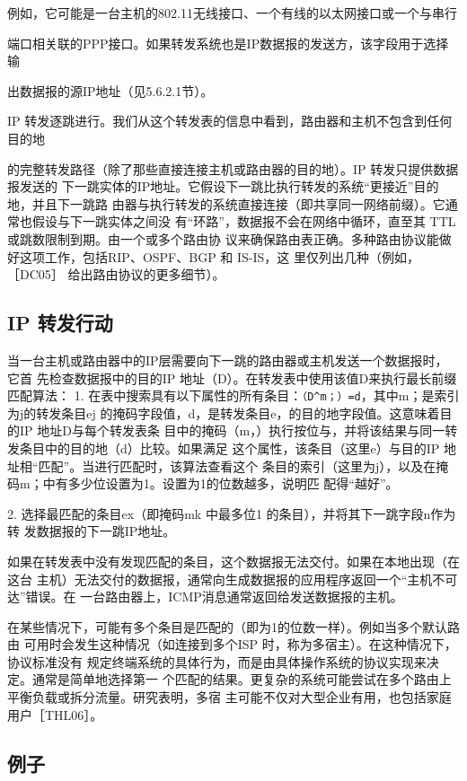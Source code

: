 例如，它可能是一台主机的802.11无线接口、一个有线的以太网接口或一个与串行

端口相关联的PPP接口。如果转发系统也是IP数据报的发送方，该字段用于选择输

出数据报的源IP地址（见5.6.2.1节）。

IP 转发逐跳进行。我们从这个转发表的信息中看到，路由器和主机不包含到任何目的地

的完整转发路径（除了那些直接连接主机或路由器的目的地）。IP 转发只提供数据报发送的
下一跳实体的IP地址。它假设下一跳比执行转发的系统“更接近”目的地，并且下一跳路
由器与执行转发的系统直接连接（即共享同一网络前缀）。它通常也假设与下一跳实体之间没
有“环路”，数据报不会在网络中循环，直至其 TTL 或跳数限制到期。由一个或多个路由协
议来确保路由表正确。多种路由协议能做好这项工作，包括RIP、OSPF、BGP 和 IS-IS，这
里仅列出几种（例如，［DC05］ 给出路由协议的更多细节）。

\subsection{IP 转发行动}
当一台主机或路由器中的IP层需要向下一跳的路由器或主机发送一个数据报时，它首
先检查数据报中的目的IP 地址（D）。在转发表中使用该值D来执行最长前缀匹配算法：
1. 在表中搜索具有以下属性的所有条目：\verb|（D^m；）=d|，其中m；是索引为j的转发条目ej
的掩码字段值，d，是转发条目e，的目的地字段值。这意味着目的IP 地址D与每个转发表条
目中的掩码（m，）执行按位与，并将该结果与同一转发条目中的目的地（d）比较。如果满足
这个属性，该条目（这里e）与目的IP 地址相“匹配”。当进行匹配时，该算法查看这个
条目的索引（这里为j），以及在掩码m；中有多少位设置为1。设置为1的位数越多，说明匹
配得“越好”。

2. 选择最匹配的条目ex（即掩码mk 中最多位1 的条目），并将其下一跳字段n作为转
发数据报的下一跳IP地址。

如果在转发表中没有发现匹配的条目，这个数据报无法交付。如果在本地出现（在这台
主机）无法交付的数据报，通常向生成数据报的应用程序返回一个“主机不可达”错误。在
一台路由器上，ICMP消息通常返回给发送数据报的主机。

在某些情况下，可能有多个条目是匹配的（即为1的位数一样）。例如当多个默认路由
可用时会发生这种情况（如连接到多个ISP 时，称为多宿主）。在这种情况下，协议标准没有
规定终端系统的具体行为，而是由具体操作系统的协议实现来决定。通常是简单地选择第一
个匹配的结果。更复杂的系统可能尝试在多个路由上平衡负载或拆分流量。研究表明，多宿
主可能不仅对大型企业有用，也包括家庭用户［THL06］。

\subsection{例子}

